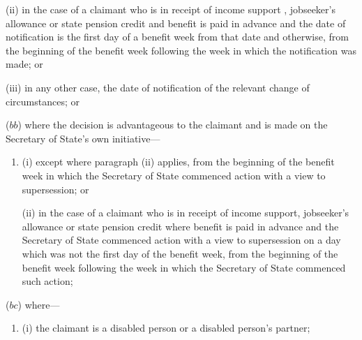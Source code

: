 \documentclass[12pt,a4paper]{article}
\begin{document}
\begin{enumerate}
\begin{enumerate}
(ii) in the case of a claimant who is in receipt of income support%
, jobseeker's allowance or state pension credit  %
and benefit is paid in advance and the date of notification is the first day of a benefit week from that date and otherwise, from the beginning of the benefit week following the week in which the notification was made; or

(iii) in any other case, the date of notification of the relevant change of circumstances; or
\end{enumerate}


($bb$) where the decision is advantageous to the claimant and is made on the Secretary of State’s own initiative—
\begin{enumerate}\item[]
(i) except where paragraph (ii) applies, from the beginning of the benefit week in which the Secretary of State commenced action with a view to supersession; or

(ii) in the case of a claimant who is in receipt of income support, jobseeker’s allowance or state pension credit where benefit is paid in advance and the Secretary of State commenced action with a view to supersession on a day which was not the first day of the benefit week, from the beginning of the benefit week following the week in which the Secretary of State commenced such action;
\end{enumerate}


($bc$) where—
\begin{enumerate}\item[]
(i) the claimant is a disabled person or a disabled person’s partner;


\end{enumerate}
\end{enumerate}
\end{document}
